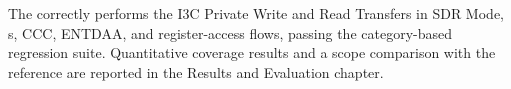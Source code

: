 The \Controller{} correctly performs the I3C Private Write and Read Transfers in SDR Mode, \ImmediateDataTransfer{}s, CCC, ENTDAA, and
register-access flows, passing the category-based regression suite. Quantitative coverage results and a
scope comparison with the reference are reported in the Results and Evaluation chapter.
